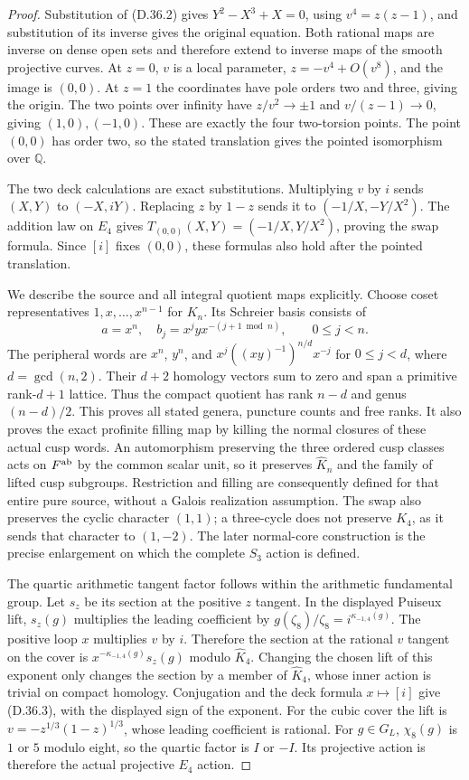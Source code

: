 \begin{proof}
Substitution of (D.36.2) gives
$Y^2-X^3+X=0$, using $v^4=z(z-1)$, and substitution of its
inverse gives the original equation. Both rational maps are inverse
on dense open sets and therefore extend to inverse maps of the
smooth projective curves. At $z=0$, $v$ is a local parameter,
$z=-v^4+O(v^8)$, and the image is $(0,0)$. At $z=1$ the
coordinates have pole orders two and three, giving the origin.
The two points over infinity have $z/v^2\to\pm1$ and
$v/(z-1)\to0$, giving $(1,0),(-1,0)$. These are exactly the four
two-torsion points. The point $(0,0)$ has order two, so the stated
translation gives the pointed isomorphism over $\mathbb Q$.

The two deck calculations are exact substitutions. Multiplying $v$
by $i$ sends $(X,Y)$ to $(-X,iY)$. Replacing $z$ by $1-z$ sends
it to $(-1/X,-Y/X^2)$. The addition law on $E_4$ gives
$T_{(0,0)}(X,Y)=(-1/X,Y/X^2)$, proving the swap formula. Since
$[i]$ fixes $(0,0)$, these formulas also hold after the pointed
translation.

We describe the source and all integral quotient maps explicitly.
Choose coset representatives $1,x,\ldots,x^{n-1}$ for $K_n$.
Its Schreier basis consists of
\[
 a=x^n,\quad b_j=x^j yx^{-(j+1\bmod n)},
                    \qquad0\leq j<n.                 \tag{D.36.9}
\]
The peripheral words are $x^n$, $y^n$, and
$x^j((xy)^{-1})^{n/d}x^{-j}$ for $0\leq j<d$, where
$d=\gcd(n,2)$. Their $d+2$ homology vectors sum to zero and span
a primitive rank-$d+1$ lattice. Thus the compact quotient has rank
$n-d$ and genus $(n-d)/2$. This proves all stated genera,
puncture counts and free ranks. It also proves the exact profinite
filling map by killing the normal closures of these actual cusp
words. An automorphism preserving the three ordered cusp classes acts
on $F^{\rm ab}$ by the common scalar unit, so it preserves
$\widehat K_n$ and the family of lifted
cusp subgroups. Restriction and filling are consequently defined
for that entire pure source, without a Galois realization assumption.
The swap also preserves the cyclic character $(1,1)$; a three-cycle
does not preserve $K_4$, as it sends that character to $(1,-2)$.
The later normal-core construction is the precise enlargement on
which the complete $S_3$ action is defined.

The quartic arithmetic tangent factor follows within the arithmetic
fundamental group. Let $s_z$ be its section at the positive $z$
tangent. In the displayed Puiseux lift, $s_z(g)$ multiplies the
leading coefficient by
$g(\zeta_8)/\zeta_8=i^{\kappa_{-1,4}(g)}$.
The positive loop $x$ multiplies $v$ by $i$. Therefore the section
at the rational $v$ tangent on the cover is
$x^{-\kappa_{-1,4}(g)}s_z(g)$ modulo $\widehat K_4$.
Changing the chosen lift of this exponent only changes the section
by a member of $\widehat K_4$, whose inner action is trivial on
compact homology. Conjugation and the deck formula $x\mapsto[i]$
give (D.36.3), with the displayed sign of the exponent. For the
cubic cover the lift is
$v=-z^{1/3}(1-z)^{1/3}$, whose leading coefficient is rational.
For $g\in G_L$, $\chi_8(g)$ is $1$ or $5$ modulo eight, so the
quartic factor is $I$ or $-I$. Its projective action is therefore
the actual projective $E_4$ action.


\end{proof}
